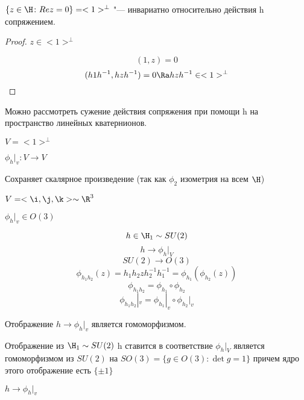 \begin{conseq}
 $\{z \in \H\colon Re z = 0\} = <1>^\bot$ "--- инвариатно
 относительно действия h сопряжением.
\end{conseq}

\begin{proof}
$z \in <1>^\bot$

$$(1, z) = 0$$
$$(h1h^{-1}, hzh^{-1}) = 0 \Ra hzh^{-1} \in <1>^\bot$$
\end{proof}

Можно рассмотреть сужение действия сопряжения при помощи h на пространство линейных кватернионов.

$V = <1>^\bot$

$\phi_h|_v \colon V \to V$

Сохраняет скалярное произведение (так как $\phi_2$ изометрия на всем $\H$)

$V = <\i, \j, \k> \sim \R^3$

$\phi_h|_v \in O(3)$

$$h \in \H_1 \sim SU(2)$$
$$h \to \phi_h|_V$$
$$SU(2) \to O(3)$$
$$\phi_{h_1h_2}(z) = h_1h_2zh_2^{-1}h_1^{-1} = \phi_{h_1}(\phi_{h_2}(z))$$
$$\phi_{h_1h_2} = \phi_{h_1}\circ \phi_{h_2}$$
$$\phi_{h_1h_2}|_v = \phi_{h_1}|_v \circ \phi_{h_2}|_v $$

Отображение $h \to \phi_h|_v$ является гомоморфизмом.

\begin{theorem}
    Отображение из $\H_1 \sim SU(2)$  h ставится
    в соответствие $\phi_h|_V$  является гомоморфизмом из
    $SU(2)$ на $SO(3) = \{g \in O(3) \colon \det g = 1\}$
    причем ядро этого отображение есть $\{\pm1\}$

    $h \to \phi_h|_v$
\end{theorem}

